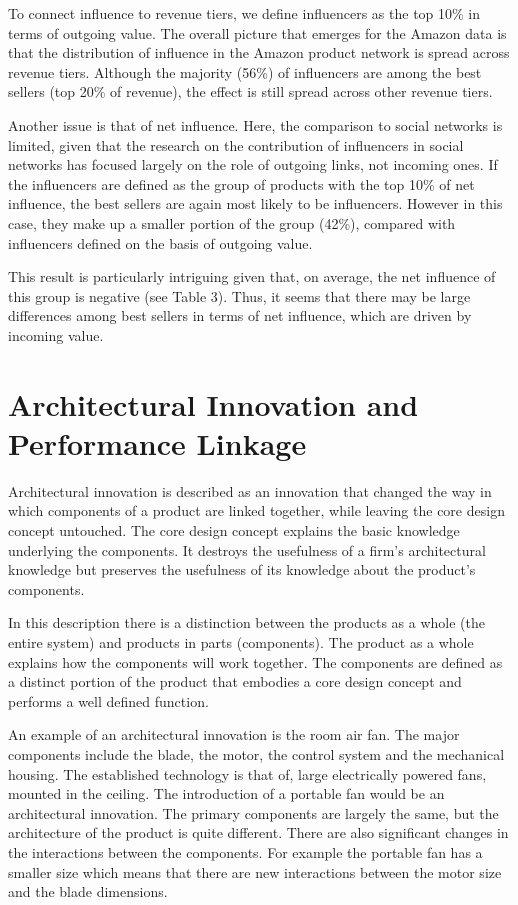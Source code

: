 To connect influence to revenue tiers, we define influencers as the top 10\% in terms of outgoing value. The overall picture that emerges for the Amazon data is that the distribution of influence in the Amazon product network is spread across revenue tiers. Although the majority (56\%) of influencers are among the best sellers (top 20\% of revenue), the effect is still spread across other revenue tiers.

Another issue is that of net influence. Here, the comparison to social networks is limited, given that the research on the contribution of influencers in social networks has focused largely on the role of outgoing links, not incoming ones. If the influencers are defined as the group of products with the top 10\% of net influence, the best sellers are again most likely to be influencers. However in this case, they make up a smaller portion of the group (42\%), compared with influencers defined on the basis of outgoing value.

This result is particularly intriguing given that, on average, the net influence of this group is negative (see Table 3). Thus, it seems that there may be large differences among best sellers in terms of net influence, which are driven by incoming value.


\section{Architectural Innovation and Performance Linkage}

Architectural innovation is described as an innovation that changed the way in which components of a product are linked together, while leaving the core design concept untouched. The core design concept explains the basic knowledge underlying the components. It destroys the usefulness of a firm’s architectural knowledge but preserves the usefulness of its knowledge about the product’s components.

In this description there is a distinction between the products as a whole (the entire system) and products in parts (components). The product as a whole explains how the components will work together. The components are defined as a distinct portion of the product that embodies a core design concept and performs a well defined function.

An example of an architectural innovation is the room air fan. The major components include the blade, the motor, the control system and the mechanical housing. The established technology is that of, large electrically powered fans, mounted in the ceiling. The introduction of a portable fan would be an architectural innovation. The primary components are largely the same, but the architecture of the product is quite different. There are also significant changes in the interactions between the components. For example the portable fan has a smaller size which means that there are new interactions between the motor size and the blade dimensions.

